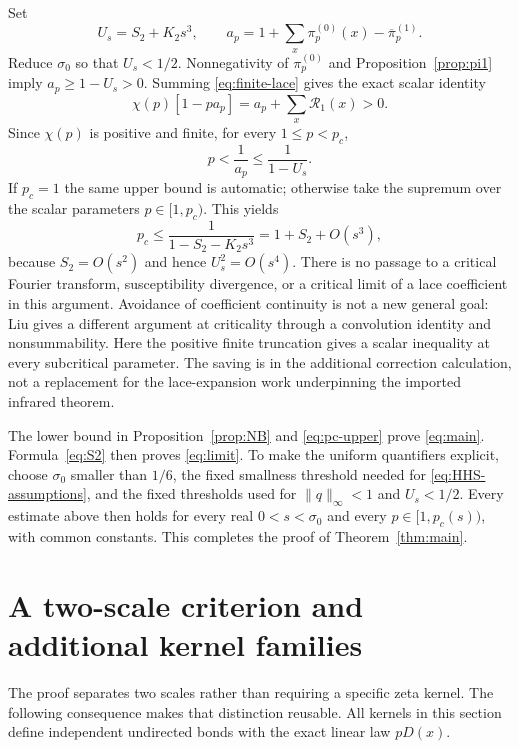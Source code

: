 \documentclass[11pt]{article}
\theoremstyle{definition}
\begin{document}
Set
\[
 U_s=S_2+K_2s^3,\qquad
 a_p=1+\sum_x\pi_p^{(0)}(x)-\overline\pi_p^{(1)}.
\]
Reduce $\sigma_0$ so that $U_s<1/2$. Nonnegativity of
$\pi_p^{(0)}$ and Proposition~\ref{prop:pi1} imply
$a_p\ge1-U_s>0$. Summing \eqref{eq:finite-lace} gives the exact scalar
identity
\begin{equation}\label{eq:scalar}
 \chi(p)[1-pa_p]=a_p+\sum_x\mathcal R_1(x)>0.
\end{equation}
Since $\chi(p)$ is positive and finite, for every $1\le p<p_c$,
\begin{equation}\label{eq:subcrit-upper}
 p<\frac1{a_p}\le\frac1{1-U_s}.
\end{equation}
If $p_c=1$ the same upper bound is automatic; otherwise take the supremum
over the scalar parameters $p\in[1,p_c)$. This yields
\begin{equation}\label{eq:pc-upper}
 p_c\le\frac1{1-S_2-K_2s^3}=1+S_2+O(s^3),
\end{equation}
because $S_2=O(s^2)$ and hence $U_s^2=O(s^4)$.
There is no passage to a critical Fourier transform, susceptibility
divergence, or a critical limit of a lace coefficient in this argument.
Avoidance of coefficient continuity is not a new general goal:
Liu \cite[Appendix~A]{Liu2025} gives a different argument at criticality
through a convolution identity and nonsummability. Here the positive finite
truncation gives a scalar inequality at every subcritical parameter. The saving
is in the additional correction calculation, not a replacement for the
lace-expansion work underpinning the imported infrared theorem.

The lower bound in Proposition~\ref{prop:NB} and
\eqref{eq:pc-upper} prove \eqref{eq:main}. Formula~\eqref{eq:S2}
then proves \eqref{eq:limit}. To make the uniform quantifiers explicit,
choose $\sigma_0$ smaller than $1/6$, the fixed smallness threshold needed
for \eqref{eq:HHS-assumptions}, and the fixed thresholds used for
$\|q\|_\infty<1$ and $U_s<1/2$. Every estimate above then holds for
every real $0<s<\sigma_0$ and every $p\in[1,p_c(s))$, with common
constants. This completes the proof of Theorem~\ref{thm:main}.

\section{A two-scale criterion and additional kernel families}
\label{sec:extensions}

The proof separates two scales rather than requiring a specific zeta kernel.
The following consequence makes that distinction reusable. All kernels in this
section define independent undirected bonds with the exact linear law $pD(x)$.
\end{document}
